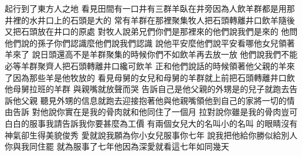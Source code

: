 \bchapter%
起行\chientien 到了東方人之地\yuentien 
{}看見田間有一口井\chientien 有三群羊臥在井旁\yuentien 因為人飲羊群\chientien 都是用那井裡的水\yuentien 井口上的石頭是大的\chuan 
{}常有羊群在那裡聚集\yuentien 牧人把石頭轉離井口飲羊\chientien 隨後又把石頭放在井口的原處\chuan 
{}對牧人說\chientien 弟兄們\chientien 你們是那裡來的\yuentien 他們說\chientien 我們是來的\chuan 
{}他問他們說\chientien{}的孫子\chientien 你們認識麼\yuentien 他們說\chientien 我們認識\chuan 
{}說\chientien 他平安麼\yuentien 他們說\chientien 平安\yuentien 看哪\chientien 他女兒領著羊來了\chuan 
{}說\chientien 日頭還高\chientien 不是羊群聚集的時候\chientien 你們不如飲羊再去放一放\chuan 
{}他們說\chientien 我們不能\chientien 必等羊群聚齊\chientien 人把石頭轉離井口\chientien 纔可飲羊\chuan 
{}正和他們說話的時候\chientien{}領著他父親的羊來了\chientien 因為那些羊是他牧放的\chuan 
{}看見母舅的女兒\chientien 和母舅的羊群\chientien 就上前把石頭轉離井口\chientien 飲他母舅拉班的羊群\chuan 
{}與親嘴\chientien 就放聲而哭\chuan 
{}告訴自己是他父親的外甥\chientien 是的兒子\yuentien{}就跑去告訴他父親\chuan\Chuan
{}聽見外甥的信息\chientien 就跑去迎接\chientien 抱著他與他親嘴\chientien 領他到自己的家\yuentien{}將一切的情由告訴\chuan 
{}對他說\chientien 你實在是我的骨肉\yuentien{}就和他同住了一個月\chuan 
{}拉對說\chientien 你雖是我的骨肉\chientien{}豈可白白的服事我\chientien 請告訴我你要甚麼為工價\chuan 
{}有兩個女兒\chientien 大的名叫\chientien 小的名叫\chuan 
{}的眼睛沒有神氣\chientien{}卻生得美貌俊秀\chuan 
{}愛\chientien 就說\chientien 我願為你小女兒服事你七年\chuan 
{}說\chientien 我把他給你\chientien 勝似給別人\chientien 你與我同住罷\chuan 
{}就為服事了七年\yuentien 他因為深愛\chientien 就看這七年如同幾天\chuan\Chuan
